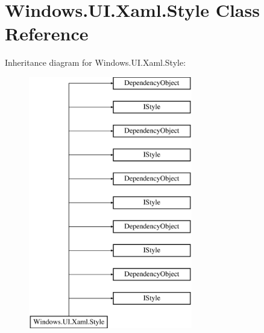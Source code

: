 \hypertarget{class_windows_1_1_u_i_1_1_xaml_1_1_style}{}\section{Windows.\+U\+I.\+Xaml.\+Style Class Reference}
\label{class_windows_1_1_u_i_1_1_xaml_1_1_style}
Inheritance diagram for Windows.\+U\+I.\+Xaml.\+Style\+:\begin{figure}[H]
\begin{center}
\leavevmode
\includegraphics[height=11.000000cm]{class_windows_1_1_u_i_1_1_xaml_1_1_style}
\end{center}
\end{figure}
